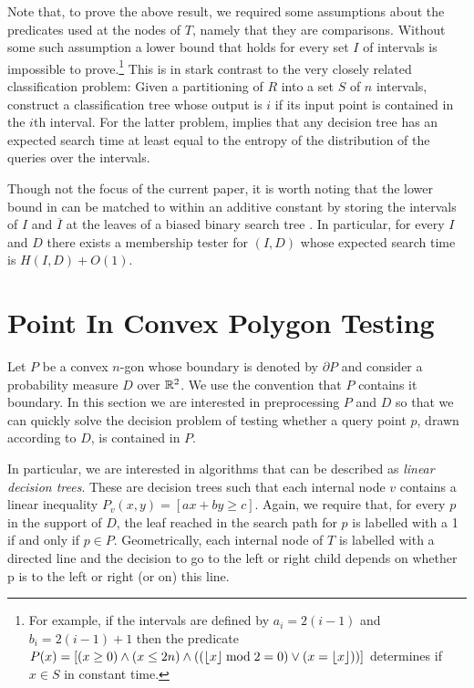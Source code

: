 \documentclass[charterfonts,lotsofwhite]{patmorin}
\begin{document}
Note that, to prove the above result, we required some assumptions
about the predicates used at the nodes of $T$, namely that they are
comparisons.  Without some such assumption a lower bound that holds
for every set $I$ of intervals is impossible to prove.\footnote{For
example, if the intervals are defined by $a_i=2(i-1)$ and
$b_i=2(i-1)+1$ then the predicate $P(x)=[(x\ge 0)\wedge(x\le
2n)\wedge((\left\lfloor x \right\rfloor\bmod 2=0)\vee(x=\left\lfloor x \right\rfloor))]$ determines if $x\in
S$ in constant time.} This is in stark contrast to the very closely
related classification problem: Given a partitioning of $R$ into a set
$S$ of $n$ intervals, construct a classification tree whose output is
$i$ if its input point is contained in the $i$th interval.  For the
latter problem,  implies that any decision tree has an
expected search time at least equal to the entropy of the distribution
of the queries over the intervals. 

Though not the focus of the current paper, it is worth noting that the
lower bound in  can be matched to within an additive
constant by storing the intervals of $I$ and $\overline{I}$ at the
leaves of a biased binary search tree \cite{kXX,mXX}.  In particular,
for every $I$ and $D$ there exists a membership tester for $(I,D)$
whose expected search time is $H(I,D)+O(1)$.

\section{Point In Convex Polygon Testing}

Let $P$ be a convex $n$-gon whose boundary is denoted by $\partial P$
and consider a probability measure $D$ over $\mathbb{R}^2$.  We use the
convention that $P$ contains it boundary.  In this section we are
interested in preprocessing $P$ and $D$ so that we can quickly solve the
decision problem of testing whether a query point $p$, drawn according
to $D$, is contained in $P$. 

In particular, we are interested in algorithms that can be described
as \emph{linear decision trees}.  These are decision trees such that
each internal node $v$ contains a linear inequality $P_v(x,y)=[ax+by
\ge c]$.  Again, we require that, for every $p$ in the support of $D$,
the leaf reached in the search path for $p$ is labelled with a 1 if
and only if $p\in P$.  Geometrically, each internal node of $T$ is
labelled with a directed line and the decision to go to the left or
right child depends on whether p is to the left or right (or on) this
line.  
\end{document}
